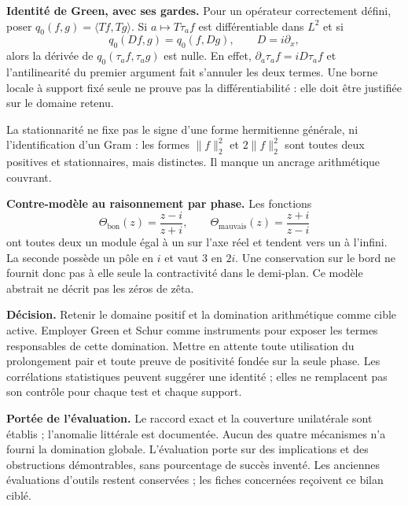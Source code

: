 \documentclass[
  11pt,
]{article}
\begin{document}
\textbf{Identité de Green, avec ses gardes.} Pour un opérateur
correctement défini, poser \(q_0(f,g)=\langle Tf,Tg\rangle\). Si
\(a\mapsto T\tau_af\) est différentiable dans \(L^2\) et si \[
q_0(Df,g)=q_0(f,Dg),\qquad D=i\partial_x,
\] alors la dérivée de \(q_0(\tau_af,\tau_ag)\) est nulle. En effet,
\(\partial_a\tau_af=iD\tau_af\) et l'antilinearité du premier argument
fait s'annuler les deux termes. Une borne locale à support fixé seule ne
prouve pas la différentiabilité : elle doit être justifiée sur le
domaine retenu.

La stationnarité ne fixe pas le signe d'une forme hermitienne générale,
ni l'identification d'un Gram : les formes \(\|f\|_2^2\) et
\(2\|f\|_2^2\) sont toutes deux positives et stationnaires, mais
distinctes. Il manque un ancrage arithmétique couvrant.

\textbf{Contre-modèle au raisonnement par phase.} Les fonctions \[
\Theta_{\mathrm{bon}}(z)=\frac{z-i}{z+i},\qquad
\Theta_{\mathrm{mauvais}}(z)=\frac{z+i}{z-i}
\] ont toutes deux un module égal à un sur l'axe réel et tendent vers un
à l'infini. La seconde possède un pôle en \(i\) et vaut \(3\) en \(2i\).
Une conservation sur le bord ne fournit donc pas à elle seule la
contractivité dans le demi-plan. Ce modèle abstrait ne décrit pas les
zéros de zêta.

\textbf{Décision.} Retenir le domaine positif et la domination
arithmétique comme cible active. Employer Green et Schur comme
instruments pour exposer les termes responsables de cette domination.
Mettre en attente toute utilisation du prolongement pair et toute preuve
de positivité fondée sur la seule phase. Les corrélations statistiques
peuvent suggérer une identité ; elles ne remplacent pas son contrôle
pour chaque test et chaque support.

\textbf{Portée de l'évaluation.} Le raccord exact et la couverture
unilatérale sont établis ; l'anomalie littérale est documentée. Aucun
des quatre mécanismes n'a fourni la domination globale. L'évaluation
porte sur des implications et des obstructions démontrables, sans
pourcentage de succès inventé. Les anciennes évaluations d'outils
restent conservées ; les fiches concernées reçoivent ce bilan ciblé.
\end{document}
